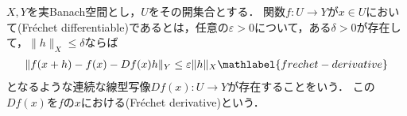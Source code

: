 \documentclass{ltjsarticle}
\begin{document}
\begin{thmbox}
\begin{definition}
\(X, Y\)を実Banach空間とし，\(U\)をその開集合とする．
関数\(f \colon U \to Y\)が\(x \in U\)において(Fréchet differentiable)であるとは，任意の\(\varepsilon > 0\)について，ある\(\delta > 0\)が存在して，\(\lVert h \rVert_X \leq \delta\)ならば
\begin{align}
    \lVert f(x + h) - f(x) - Df(x) h \rVert_Y \leq \varepsilon \lVert h \rVert_X \mathlabel{frechet-derivative}
\end{align}
となるような連続な線型写像\(Df(x) \colon U \to Y\)が存在することをいう．
この\(Df(x)\)を\(f\)の\(x\)における(Fréchet derivative)という．
\end{definition}
\end{thmbox}
\end{document}
